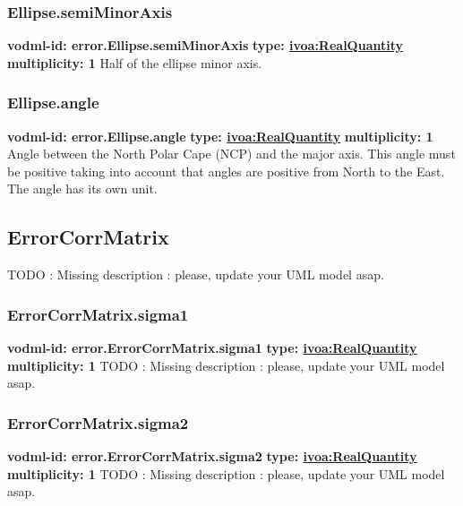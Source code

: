     \subsubsection{Ellipse.semiMinorAxis}
      \textbf{vodml-id: error.Ellipse.semiMinorAxis} \newline
      \textbf{type: \hyperref[sect:ivoa]{ivoa:RealQuantity}} \newline
      \textbf{multiplicity: 1} \newline
      Half of the ellipse minor axis.

    \subsubsection{Ellipse.angle}
      \textbf{vodml-id: error.Ellipse.angle} \newline
      \textbf{type: \hyperref[sect:ivoa]{ivoa:RealQuantity}} \newline
      \textbf{multiplicity: 1} \newline
      Angle between the North Polar Cape (NCP) and the major axis. This angle must be positive taking into account that angles are positive from North to the East. The angle has its own unit.

  \subsection{ErrorCorrMatrix}
  \label{sect:error.ErrorCorrMatrix}
    TODO : Missing description : please, update your UML model asap.

    \subsubsection{ErrorCorrMatrix.sigma1}
      \textbf{vodml-id: error.ErrorCorrMatrix.sigma1} \newline
      \textbf{type: \hyperref[sect:ivoa]{ivoa:RealQuantity}} \newline
      \textbf{multiplicity: 1} \newline
      TODO : Missing description : please, update your UML model asap.

    \subsubsection{ErrorCorrMatrix.sigma2}
      \textbf{vodml-id: error.ErrorCorrMatrix.sigma2} \newline
      \textbf{type: \hyperref[sect:ivoa]{ivoa:RealQuantity}} \newline
      \textbf{multiplicity: 1} \newline
      TODO : Missing description : please, update your UML model asap.

